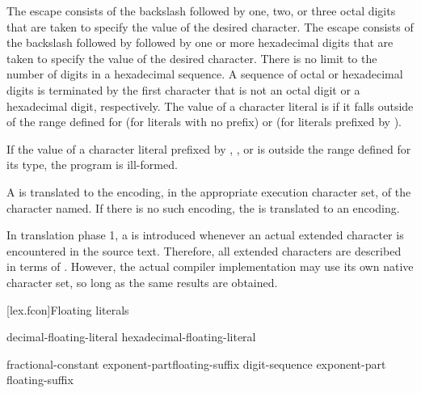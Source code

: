 \pnum
The escape
%
 consists of the backslash followed by one,
two, or three octal digits that are taken to specify the value of the
desired character. The escape
%
consists of the backslash followed by  followed by one or more
hexadecimal digits that are taken to specify the value of the desired
character. There is no limit to the number of digits in a hexadecimal
sequence. A sequence of octal or hexadecimal digits is terminated by the
first character that is not an octal digit or a hexadecimal digit,
respectively.
%
The value of a character literal is  if it falls outside of the 
range defined for  (for literals with no prefix) or
 (for literals prefixed by ).
\begin{note}
If the value of a character literal prefixed by
, , or 
is outside the range defined for its type,
the program is ill-formed.
\end{note}

\pnum
A  is translated to the encoding, in the appropriate
execution character set, of the character named. If there is no such
encoding, the  is translated to an
 encoding.
\begin{note} In translation phase 1, a  is introduced whenever an
actual extended
character is encountered in the source text. Therefore, all extended
characters are described in terms of . However,
the actual compiler implementation may use its own native character set,
so long as the same results are obtained. \end{note}

[lex.fcon]{Floating literals}

%
\begin{bnf}
\br
    decimal-floating-literal\br
    hexadecimal-floating-literal
\end{bnf}

\begin{bnf}
\br
    fractional-constant exponent-part\opt floating-suffix\opt\br
    digit-sequence exponent-part floating-suffix\opt
\end{bnf}

